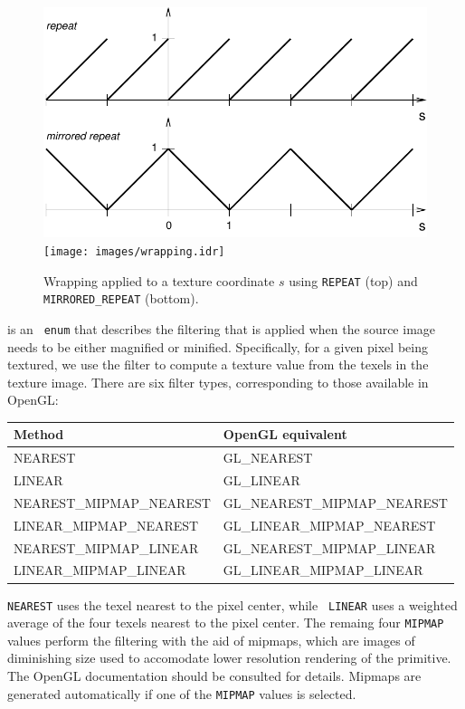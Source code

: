 \begin{figure}[h]
\begin{center}
\iflatexml
 \includegraphics[]{images/wrapping}
\else
 \texttt{[image: images/wrapping.idr]}
\fi
\end{center}
\caption{Wrapping applied to a texture coordinate $s$
using {\tt REPEAT} (top) and {\tt MIRRORED\_REPEAT} (bottom).}
\label{wrapping:fig}
\end{figure}
%

 is an {\tt
enum} that describes the filtering that is applied when the source
image needs to be either magnified or minified. Specifically, for a
given pixel being textured, we use the filter to compute a texture
value from the texels in the texture image. There are six filter
types, corresponding to those available in OpenGL:
%
\begin{center}
\begin{tabular}{|ll|}
\hline
Method & OpenGL equivalent\\
\hline 
NEAREST & GL\_NEAREST \\
LINEAR & GL\_LINEAR \\
NEAREST\_MIPMAP\_NEAREST & GL\_NEAREST\_MIPMAP\_NEAREST \\
LINEAR\_MIPMAP\_NEAREST & GL\_LINEAR\_MIPMAP\_NEAREST \\
NEAREST\_MIPMAP\_LINEAR & GL\_NEAREST\_MIPMAP\_LINEAR \\
LINEAR\_MIPMAP\_LINEAR & GL\_LINEAR\_MIPMAP\_LINEAR \\
\hline
\end{tabular}
\end{center}
{\tt NEAREST} uses the texel nearest to the pixel center, while {\tt
LINEAR} uses a weighted average of the four texels nearest to the
pixel center. The remaing four {\tt MIPMAP} values perform the
filtering with the aid of mipmaps, which are images of diminishing
size used to accomodate lower resolution rendering of the primitive.
The OpenGL documentation should be consulted for details.  Mipmaps are
generated automatically if one of the {\tt MIPMAP} values is selected.

